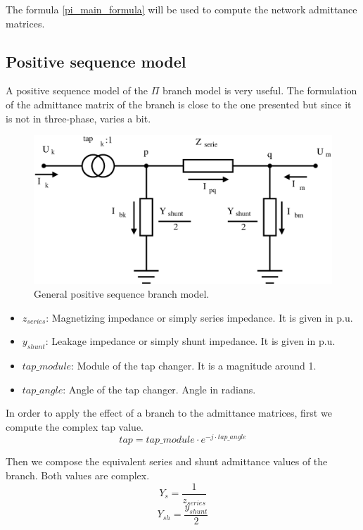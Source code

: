 \documentclass[nols,a4paper,twoside,notoc,fleqn]{tufte-book}
\begin{document}
The formula \ref{pi_main_formula} will be used to compute the network admittance matrices.


\subsection{Positive sequence model}

A positive sequence model of the $\Pi$ branch model is very useful. The formulation of the admittance matrix of the branch is close to the one presented but since it is not in three-phase, varies a bit.

\begin{center}
	\begin{figure}[h]
		\includegraphics[width=0.7\linewidth]{img/pi-trafo.eps}
		\caption{General positive sequence branch model.}
		\label{pi_model_ps}
	\end{figure}
\end{center}

\begin{itemize}
	\item $z_{series}$: Magnetizing impedance or simply series impedance. It is given in p.u.
	\item $y_{shunt}$: Leakage impedance or simply shunt impedance. It is given in p.u.
	\item $tap\_module$: Module of the tap changer. It is a magnitude around 1.
	\item $tap\_angle$: Angle of the tap changer. Angle in radians.\newline
\end{itemize}



In order to apply the effect of a branch to the admittance matrices, first we compute the complex tap value.
$$tap = tap\_module \cdot e^{-j \cdot tap\_angle}$$  

Then we compose the equivalent series and shunt admittance values of the branch. Both values are complex.
$$Y_s = \frac{1}{z_{series}}$$
$$Y_{sh} = \frac{y_{shunt}}{2}$$
\end{document}
